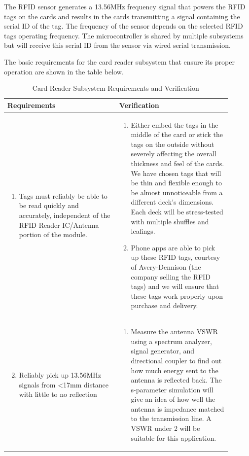 \documentclass[12pt]{article}
\begin{document}
The RFID sensor generates a 13.56MHz frequency signal that powers the RFID tags on the cards and results in the cards transmitting a signal containing the serial ID of the tag. The frequency of the sensor depends on the selected RFID tags operating frequency. The microcontroller is shared by multiple subsystems but will receive this serial ID from the sensor via wired serial transmission.

The basic requirements for the card reader subsystem that ensure its proper operation are shown in the table below.

\begin{table}[!h]
	\caption{Card Reader Subsystem Requirements and Verification}
	\label{tab:card_rv}
	\centering
	\begin{tabular}{| p{0.45\linewidth} | p{0.45\linewidth} |} 
 		\hline
 		\textbf{Requirements} & \textbf{Verification} \\ 
 		\hline
 		\begin{enumerate}
 			\item Tags must reliably be able to be read quickly and accurately, independent of the RFID Reader IC/Antenna portion of the module.
		\end{enumerate} & \begin{enumerate}[label=\alph*)]
 			\item Either embed the tags in the middle of the card or stick the tags on the outside without severely affecting the overall thickness and feel of the cards. We have chosen tags that will be thin and flexible enough to be almost unnoticeable from a different deck's dimensions. Each deck will be stress-tested with multiple shuffles and leafings.
 			\item Phone apps are able to pick up these RFID tags, courtesy of Avery-Dennison (the company selling the RFID tags) and we will ensure that these tags work properly upon purchase and delivery.
		\end{enumerate} \\
		\hline
		\begin{enumerate}
		\setcounter{enumi}{1}
 			\item Reliably pick up 13.56MHz signals from <17mm distance with little to no reflection
		\end{enumerate} & \begin{enumerate}[label=\alph*)]
 			\item Measure the antenna VSWR using a spectrum analyzer, signal generator, and directional coupler to find out how much energy sent to the antenna is reflected back. The s-parameter simulation will give an idea of how well the antenna is impedance matched to the transmission line. A VSWR under 2 will be suitable for this application.

\end{enumerate}
\end{tabular}
\end{table}
\end{document}
